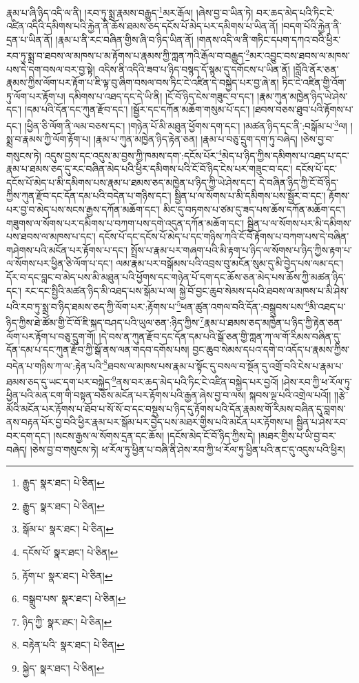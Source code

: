 རྣམ་པ་ཞི་ཉིད་འདི་ལ་ནི། །རབ་ཏུ་སྨྲ་རྣམས་བརྒྱུད་\footnote{རྒྱུད་  སྣར་ཐང་།  པེ་ཅིན། }མར་རྒོལ། །ཞེས་བྱ་བ་ཡིན་ཏེ། བར་ཆད་མེད་པའི་ཏིང་ངེ་འཛིན་འདིའི་དམིགས་པའི་རྐྱེན་ནི་ཆོས་ཐམས་ཅད་དངོས་པོ་མེད་པར་དམིགས་པ་ཡིན་ནོ། །བདག་པོའི་རྐྱེན་ནི་དྲན་པ་ཡིན་ནོ། །རྣམ་པ་ནི་རང་བཞིན་གྱིས་ཞི་བ་ཉིད་ཡིན་ནོ། །གནས་འདི་ལ་ནི་གཏིང་དཔག་དཀའ་བའི་ཕྱིར་རབ་ཏུ་སྨྲ་བ་ཐབས་ལ་མཁས་པ་མ་རྟོགས་པ་རྣམས་ཀྱི་ཀླན་ཀའི་རྒོལ་བ་བརྒྱུད་\footnote{རྒྱུད་  སྣར་ཐང་།  པེ་ཅིན། }མར་འབྱུང་བས་ཐབས་ལ་མཁས་པས་དེ་དག་བསལ་བར་བྱ་སྟེ། འདིས་ནི་འདིའི་ཟབ་པ་ཉིད་བསྙད་དོ་སྙམ་དུ་དགོངས་པ་ཡིན་ནོ། །བློའི་ནོར་ཅན་རྣམས་ཀྱིས་ལོག་པར་རྟོག་པ་ཇི་ལྟ་བུ་ཞིག་བསལ་བས་ཏིང་ངེ་འཛིན་དེ་བསྐྱེད་པར་བྱ་ཞེ་ན། ཏིང་ངེ་འཛིན་གྱི་འོག་ཏུ་ལོག་པར་རྟོག་པ། དམིགས་པ་འཐད་དང་དེ་ཡི་ནི། །ངོ་བོ་ཉིད་ངེས་གཟུང་བ་དང་། །རྣམ་ཀུན་མཁྱེན་ཉིད་ཡེ་ཤེས་དང་། །དམ་པའི་དོན་དང་ཀུན་རྫོབ་དང་། །སྦྱོར་དང་དཀོན་མཆོག་གསུམ་པོ་དང་། །ཐབས་བཅས་ཐུབ་པའི་རྟོགས་པ་དང་། །ཕྱིན་ཅི་ལོག་ནི་ལམ་བཅས་དང་། །གཉེན་པོ་མི་མཐུན་ཕྱོགས་དག་དང་། །མཚན་ཉིད་དང་ནི་:བསྒོམ་པ་\footnote{སྒོམ་པ་  སྣར་ཐང་།  པེ་ཅིན། }ལ། །སྨྲ་བ་རྣམས་ཀྱི་ལོག་རྟོག་པ། །རྣམ་པ་ཀུན་མཁྱེན་ཉིད་རྟེན་ཅན། །རྣམ་པ་བཅུ་དྲུག་དག་ཏུ་བཞེད། །ཅེས་བྱ་བ་གསུངས་ཏེ། འདུས་བྱས་དང་འདུས་མ་བྱས་ཀྱི་ཁམས་དག་:དངོས་པོར་\footnote{དངོས་པོ་  སྣར་ཐང་།  པེ་ཅིན། }མེད་པ་ཉིད་ཀྱིས་དམིགས་པ་འཐད་པ་དང་རྣམ་པ་ཐམས་ཅད་དུ་རང་བཞིན་མེད་པའི་ཕྱིར་དམིགས་པའི་ངོ་བོ་ཉིད་ངེས་པར་གཟུང་བ་དང་། དངོས་པོ་དང་དངོས་པོ་མེད་པ་མི་དམིགས་པས་རྣམ་པ་ཐམས་ཅད་མཁྱེན་པ་ཉིད་ཀྱི་ཡེ་ཤེས་དང་། དེ་བཞིན་ཉིད་ཀྱི་ངོ་བོ་ཉིད་ཀྱིས་ཀུན་རྫོབ་དང་དོན་དམ་པའི་བདེན་པ་གཉིས་དང་། སྦྱིན་པ་ལ་སོགས་པ་མི་དམིགས་པས་སྦྱོར་བ་དང་། རྟོགས་པར་བྱ་བ་མེད་པས་སངས་རྒྱས་དཀོན་མཆོག་དང་། མིང་དུ་བཏགས་པ་ཙམ་དུ་ཟད་པས་ཆོས་དཀོན་མཆོག་དང་། གཟུགས་ལ་སོགས་པར་དམིགས་པ་བཀག་པས་དགེ་འདུན་དཀོན་མཆོག་དང་། སྦྱིན་པ་ལ་སོགས་པར་མི་དམིགས་པས་ཐབས་ལ་མཁས་པ་དང་། དངོས་པོ་དང་དངོས་པོ་མེད་པ་དང་གཉིས་ཀའི་ངོ་བོ་རྟོགས་པ་བཀག་པས་དེ་བཞིན་གཤེགས་པའི་མངོན་པར་རྟོགས་པ་དང་། སྤྲོས་པ་རྣམ་པར་གཞག་པའི་མི་རྟག་པ་ཉིད་ལ་སོགས་པ་ཉིད་ཀྱིས་རྟག་པ་ལ་སོགས་པར་ཕྱིན་ཅི་ལོག་པ་དང་། ལམ་རྣམ་པར་བསྒོམས་པའི་འབྲས་བུ་མངོན་སུམ་དུ་མི་བྱེད་པས་ལམ་དང་། དོར་བ་དང་བླང་བ་མེད་པས་མི་མཐུན་པའི་ཕྱོགས་དང་གཉེན་པོ་དག་དང་ཆོས་ཅན་མེད་པས་ཆོས་ཀྱི་མཚན་ཉིད་དང་། རང་དང་སྤྱིའི་མཚན་ཉིད་མི་འཐད་པས་སྒོམ་པ་ལ། སྐྱེ་བོ་བྱང་ཆུབ་སེམས་དཔའི་ཐབས་ལ་མཁས་པ་མི་ཤེས་པའི་རབ་ཏུ་སྨྲ་བ་ཉིད་ཐམས་ཅད་ཀྱི་ལོག་པར་:རྟོགས་པ་\footnote{རྟོག་པ་  སྣར་ཐང་།  པེ་ཅིན། }ཕན་ཚུན་འགལ་བའི་དོན་:བསྒྲུབས་པས་\footnote{བསྒྲུབ་པས་  སྣར་ཐང་།  པེ་ཅིན། }མི་འཐད་པ་ཉིད་ཀྱིས་ཐེ་ཚོམ་གྱི་ངོ་བོ་ཇི་སྐད་བཤད་པའི་ཡུལ་ཅན་:ཉིད་ཀྱིས་\footnote{ཉིད་ཀྱི་  སྣར་ཐང་།  པེ་ཅིན། }རྣམ་པ་ཐམས་ཅད་མཁྱེན་པ་ཉིད་ཀྱི་རྟེན་ཅན་ལོག་པར་རྟོག་པ་བཅུ་དྲུག་གོ། །དེ་བས་ན་ཀུན་རྫོབ་དང་དོན་དམ་པའི་སྒོ་ཅན་གྱི་ཀླན་ཀ་ལ་གོ་རིམས་བཞིན་དུ་དོན་དམ་པ་དང་ཀུན་རྫོབ་ཀྱི་སྒོ་ནས་ལན་གདབ་དགོས་པས། བྱང་ཆུབ་སེམས་དཔའ་དགེ་བ་འདོད་པ་རྣམས་ཀྱིས་བདེན་པ་གཉིས་ཀ་ལ་:རྟེན་པའི་\footnote{བརྟེན་པའི་  སྣར་ཐང་།  པེ་ཅིན། }ཐབས་ལ་མཁས་པས་རྣམ་པ་སྟོང་དུ་བསལ་བ་སྔོན་དུ་འགྲོ་བའི་ངེས་པ་རྣམ་པ་ཐམས་ཅད་དུ་ཡང་དག་པར་བསྐྱེད་\footnote{སྐྱེད་  སྣར་ཐང་།  པེ་ཅིན། }ནས་བར་ཆད་མེད་པའི་ཏིང་ངེ་འཛིན་བསྐྱེད་པར་བྱའོ། །ཤེས་རབ་ཀྱི་ཕ་རོལ་ཏུ་ཕྱིན་པའི་མན་ངག་གི་བསྟན་བཅོས་མངོན་པར་རྟོགས་པའི་རྒྱན་ཞེས་བྱ་བ་ལས། སྐབས་ལྔ་པའི་འགྲེལ་པའོ།། །།རྩེ་མོའི་མངོན་པར་རྟོགས་པ་ཐོབ་པ་སོ་སོ་བ་དང་བསྡུས་པ་ཉིད་དུ་རྟོགས་པའི་དོན་རྣམས་གོ་རིམས་བཞིན་དུ་བླགས་ནས་བརྟན་པོར་བྱ་བའི་ཕྱིར་རྣམ་པར་སྒོམ་པར་བྱེད་པས་མཐར་གྱིས་པའི་མངོན་པར་རྟོགས་པ། སྦྱིན་པ་ཤེས་རབ་བར་དག་དང་། །སངས་རྒྱས་ལ་སོགས་དྲན་དང་ཆོས། །དངོས་མེད་ངོ་བོ་ཉིད་ཀྱིས་དེ། །མཐར་གྱིས་པ་ཡི་བྱ་བར་བཞེད། །ཅེས་བྱ་བ་གསུངས་ཏེ། ཕ་རོལ་ཏུ་ཕྱིན་པ་བཞི་ནི་ཤེས་རབ་ཀྱི་ཕ་རོལ་ཏུ་ཕྱིན་པའི་ནང་དུ་འདུས་པའི་ཕྱིར། 